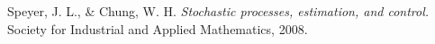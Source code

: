 \begin{thebibliography}{1}
Speyer, J. L., \& Chung, W. H.
\textit{Stochastic processes, estimation, and control.}
Society for Industrial and Applied Mathematics, 2008.
\end{thebibliography}
